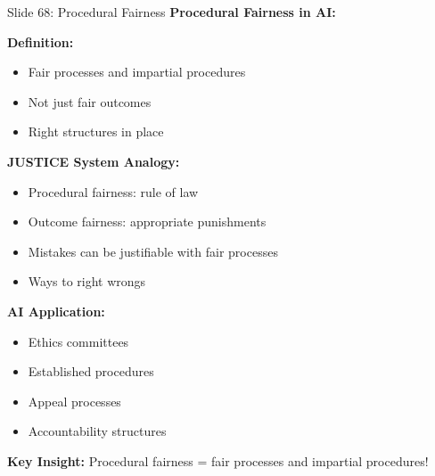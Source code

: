 \documentclass[8pt]{beamer}
\begin{document}
	\begin{frame}{Slide 68: Procedural Fairness}
		\fontsize{6.5}{7.5}\selectfont
		\textbf{Procedural Fairness in AI:}
		
		\vspace{0.1cm}
		\textbf{Definition:}
		\begin{itemize}
			\item Fair processes and impartial procedures
			\item Not just fair outcomes
			\item Right structures in place
		\end{itemize}
		
		\vspace{0.1cm}
		\textbf{JUSTICE System Analogy:}
		\begin{itemize}
			\item Procedural fairness: rule of law
			\item Outcome fairness: appropriate punishments
			\item Mistakes can be justifiable with fair processes
			\item Ways to right wrongs
		\end{itemize}
		
		\vspace{0.1cm}
		\textbf{AI Application:}
		\begin{itemize}
			\item Ethics committees
			\item Established procedures
			\item Appeal processes
			\item Accountability structures
		\end{itemize}
		
		\textcolor{myblue}{\textbf{Key Insight:}} Procedural fairness = \textcolor{myblue}{fair processes and impartial procedures}!
	\end{frame}
	
\end{document}
